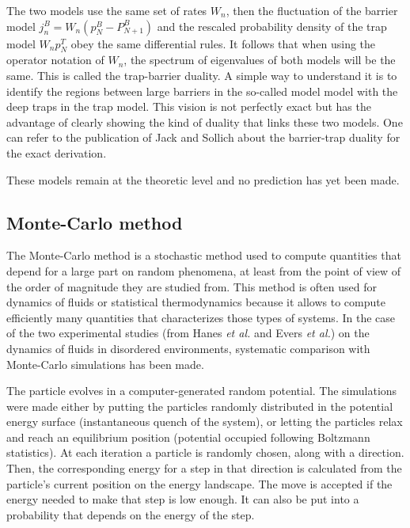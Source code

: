 \documentclass[a4paper,12pt]{article}
\newcommand{\jline}{\vspace{10pt}}
\newcommand{\etal}{\textit{et al.}}
\begin{document}
The two models use the same set of rates $W_n$, then the fluctuation of the barrier model $j_n^B=W_n\left(p_N^B-P_{N+1}^B\right)$ and the rescaled probability density of the trap model $W_n p_N^T$ obey the same differential rules. It follows that when using the operator notation of $W_n$, the spectrum of eigenvalues of both models will be the same. This is called the trap-barrier duality. A simple way to understand it is to identify the regions between large barriers in the so-called model model with the deep traps in the trap model. This vision is not perfectly exact but has the advantage of clearly showing the kind of duality that links these two models. One can refer to the publication of Jack and Sollich about the barrier-trap duality \cite{Jack2007} for the exact derivation.\jline

These models remain at the theoretic level and no prediction has yet been made.

\subsection{Monte-Carlo method}
\label{monte-carlo}

The Monte-Carlo method is a stochastic method used to compute quantities that depend for a large part on random phenomena, at least from the point of view of the order of magnitude they are studied from. This method is often used for dynamics of fluids or statistical thermodynamics because it allows to compute efficiently many quantities that characterizes those types of systems. In the case of the two experimental studies (from Hanes \etal \cite{Hanes2012} and Evers \etal \cite{Evers2013}) on the dynamics of fluids in disordered environments, systematic comparison with Monte-Carlo simulations has been made.\jline

The particle evolves in a computer-generated random potential. The simulations were made either by putting the particles randomly distributed in the potential energy surface (instantaneous quench of the system), or letting the particles relax and reach an equilibrium position (potential occupied following Boltzmann statistics). At each iteration a particle is randomly chosen, along with a direction. Then, the corresponding energy for a step in that direction is calculated from the particle's current position on the energy landscape. The move is accepted if the energy needed to make that step is low enough. It can also be put into a probability that depends on the energy of the step.\jline
\end{document}
